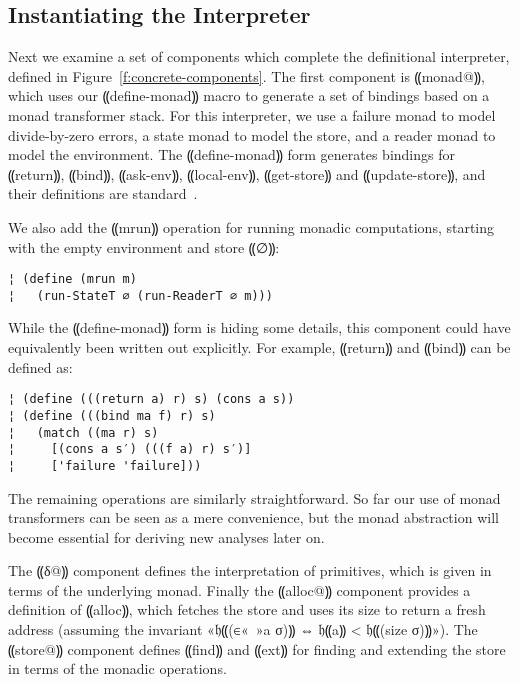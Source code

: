 \subsection{Instantiating the Interpreter}

Next we examine a set of components which complete the definitional
interpreter, defined in Figure~\ref{f:concrete-components}. The first component
is ⸨monad@⸩, which uses our ⸨define-monad⸩ macro to generate a set of bindings
based on a monad transformer stack.  For this interpreter, we use a failure
monad to model divide-by-zero errors, a state monad to model the store, and a
reader monad to model the environment.  The ⸨define-monad⸩ form generates
bindings for ⸨return⸩, ⸨bind⸩, ⸨ask-env⸩, ⸨local-env⸩, ⸨get-store⸩ and
⸨update-store⸩, and their definitions are
standard~\cite{dvanhorn:Liang1995Monad}. 

We also add the ⸨mrun⸩ operation for running monadic computations, starting
with the empty environment and store ⸨∅⸩:
\begin{lstlisting}
¦ (define (mrun m)
¦   (run-StateT ∅ (run-ReaderT ∅ m)))
\end{lstlisting}
While the ⸨define-monad⸩ form is hiding some details, this component could have
equivalently been written out explicitly. For example, ⸨return⸩ and ⸨bind⸩ can
be defined as:
\begin{lstlisting}
¦ (define (((return a) r) s) (cons a s))
¦ (define (((bind ma f) r) s)
¦   (match ((ma r) s)
¦     [(cons a s′) (((f a) r) s′)]
¦     ['failure 'failure]))
\end{lstlisting}
The remaining operations are similarly straightforward.  So far our use of
monad transformers can be seen as a mere convenience, but the monad abstraction
will become essential for deriving new analyses later on.

The ⸨δ@⸩ component defines the interpretation of primitives, which is given in
terms of the underlying monad.  Finally the ⸨alloc@⸩ component provides a
definition of ⸨alloc⸩, which fetches the store and uses its size to return a
fresh address (assuming the invariant «𝔥⸨(∈«\ »a σ)⸩ ⇔ 𝔥⸨a⸩ < 𝔥⸨(size σ)⸩»).
The ⸨store@⸩ component defines ⸨find⸩ and ⸨ext⸩ for finding and extending the
store in terms of the monadic operations.


